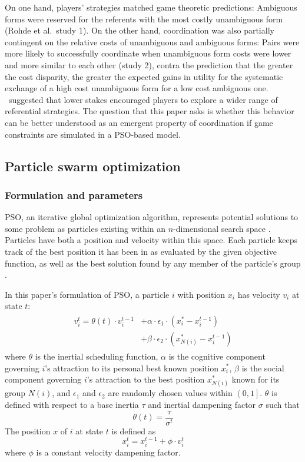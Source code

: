 \documentclass[a4paper,11pt]{article}
\begin{document}
On one hand, players' strategies matched game theoretic predictions: Ambiguous forms were reserved for the referents with the most costly unambiguous form (Rohde et al.\ study 1).  On the other hand, coordination was also partially contingent on the relative costs of unambiguous and ambiguous forms: Pairs were more likely to successfully coordinate when unambiguous form costs were lower and more similar to each other (study 2), contra the prediction that the greater the cost disparity, the greater the expected gains in utility for the systematic exchange of a high cost unambiguous form for a low cost ambiguous one. \citeauthor{rohde2012}\ suggested that lower stakes encouraged players to explore a wider range of referential strategies. The question that this paper asks is whether this behavior can be better understood as an emergent property of coordination if game constraints are simulated in a PSO-based model.


\subsection{Particle swarm optimization}
\subsubsection{Formulation and parameters}
\label{sec:2.2.3}
PSO, an iterative global optimization algorithm, represents potential solutions to some problem as particles existing within an $n$-dimensional search space \cite{kennedy1995}. Particles have both a position and velocity within this space. Each particle keeps track of the best position it has been in as evaluated by the given objective function, as well as the best solution found by any member of the particle's group \cite{chong2013}. 

In this paper's formulation of PSO, a particle $i$ with position $x_i$ has velocity $v_i$ at state $t$:
\begin{multline} \label{eq:pso_vel}
\begin{split}
v_i^t = \theta(t) \cdot v_i^{t-1} & + \alpha \cdot \epsilon_1 \cdot (x_i^* - x_i^{t-1}) \\
                                  & + \beta \cdot \epsilon_2 \cdot (x_{N(i)}^* - x_i^{t-1})
\end{split}
\end{multline}
where $\theta$ is the inertial scheduling function, $\alpha$ is the cognitive component governing $i$'s attraction to its personal best known position $x_i^*$, $\beta$ is the social component governing $i$'s attraction to the best position $x_{N(i)}^*$ known for its group $N(i)$, and $\epsilon_1$ and $\epsilon_2$ are randomly chosen values within $\left(0, 1\right]$. $\theta$ is defined with respect to a base inertia $\tau$ and inertial dampening factor $\sigma$ such that
\begin{equation}
\theta(t) = \frac{\tau}{\sigma^t} 
\end{equation}
The position $x$ of $i$ at state $t$ is defined as
\begin{equation}
x_i^t = x_i^{t-1} + \phi \cdot v_i^t 
\end{equation}
where $\phi$ is a constant velocity dampening factor.
\end{document}
